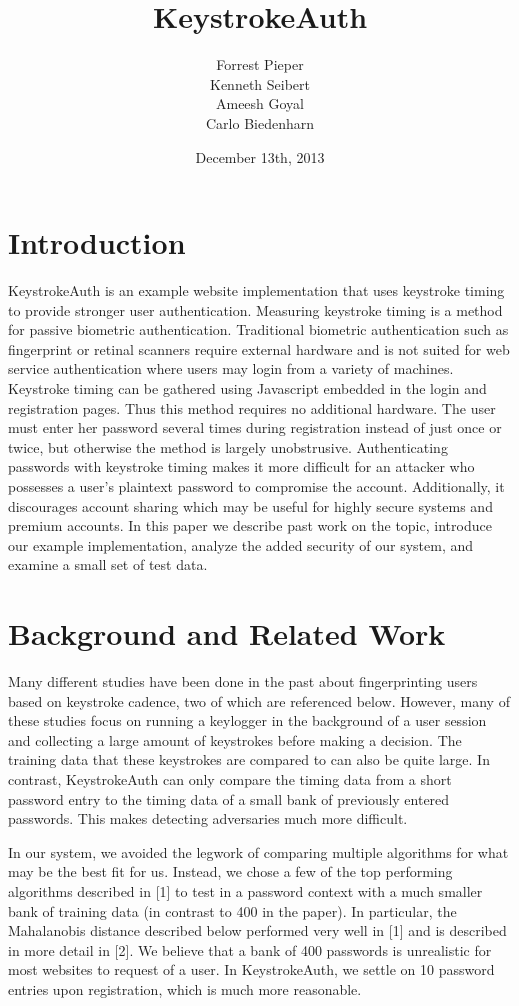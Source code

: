 \documentclass{article}
\title{KeystrokeAuth}
\author{
  Forrest Pieper\\
  Kenneth Seibert\\
  Ameesh Goyal\\
  Carlo Biedenharn
}
\date{December 13th, 2013}
\begin{document}
\maketitle

\section{Introduction}
\label{introduction}
KeystrokeAuth is an example website implementation that uses keystroke timing to provide stronger user authentication.
Measuring keystroke timing is a method for passive biometric authentication. 
Traditional biometric authentication such as fingerprint or retinal scanners require external hardware and is not suited for web service authentication where users may login from a variety of machines. 
Keystroke timing can be gathered using Javascript embedded in the login and registration pages.
Thus this method requires no additional hardware.
The user must enter her password several times during registration instead of just once or twice, but otherwise the method is largely unobstrusive.
Authenticating passwords with keystroke timing makes it more difficult for an attacker who possesses a user's plaintext password to compromise the account.
Additionally, it discourages account sharing which may be useful for highly secure systems and premium accounts.
In this paper we describe past work on the topic, introduce our example implementation, analyze the added security of our system, and examine a small set of test data.

\section{Background and Related Work}

Many different studies have been done in the past about fingerprinting users based on keystroke cadence, two of which are referenced below. However, many of these studies focus on running a keylogger in the background of a user session and collecting a large amount of keystrokes before making a decision. The training data that these keystrokes are compared to can also be quite large. In contrast, KeystrokeAuth can only compare the timing data from a short password entry to the timing data of a small bank of previously entered passwords. This makes detecting adversaries much more difficult.

In our system, we avoided the legwork of comparing multiple algorithms for what may be the best fit for us. Instead, we chose a few of the top performing algorithms described in {[}1{]} to test in a password context with a much smaller bank of training data (in contrast to 400 in the paper). In particular, the Mahalanobis distance described below performed very well in {[}1{]} and is described in more detail in {[}2{]}. We believe that a bank of 400 passwords is unrealistic for most websites to request of a user. In KeystrokeAuth, we settle on 10 password entries upon registration, which is much more reasonable. 
\end{document}
